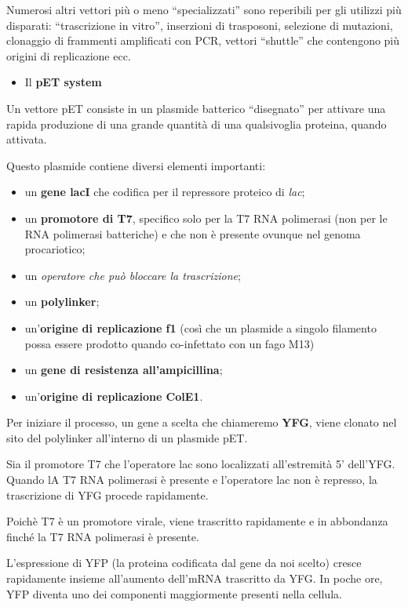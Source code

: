 \documentclass[11pt]{book}
\begin{document}
Numerosi altri vettori più o meno ``specializzati'' sono reperibili per
gli utilizzi più disparati: ``trascrizione in vitro'', inserzioni di
trasposoni, selezione di mutazioni, clonaggio di frammenti amplificati
con PCR, vettori ``shuttle'' che contengono più origini di replicazione
ecc.

\begin{itemize}
\itemsep1pt\parskip0pt
\item
  Il \textbf{pET system}
\end{itemize}

Un vettore pET consiste in un plasmide batterico ``disegnato'' per
attivare una rapida produzione di una grande quantità di una
qualsivoglia proteina, quando attivata.

Questo plasmide contiene diversi elementi importanti:

\begin{itemize}
\itemsep1pt\parskip0pt
\item
  un \textbf{gene lacI} che codifica per il repressore proteico di
  \emph{lac};
\item
  un \textbf{promotore di T7}, specifico solo per la T7 RNA polimerasi
  (non per le RNA polimerasi batteriche) e che non è presente ovunque
  nel genoma procariotico;
\item
  un \emph{operatore che può bloccare la trascrizione};
\item
  un \textbf{polylinker};
\item
  un'\textbf{origine di replicazione f1} (così che un plasmide a singolo
  filamento possa essere prodotto quando co-infettato con un fago M13)
\item
  un \textbf{gene di resistenza all'ampicillina};
\item
  un'\textbf{origine di replicazione ColE1}.
\end{itemize}

Per iniziare il processo, un gene a scelta che chiameremo \textbf{YFG},
viene clonato nel sito del polylinker all'interno di un plasmide pET.

Sia il promotore T7 che l'operatore lac sono localizzati all'estremità
5' dell'YFG. Quando lA T7 RNA polimerasi è presente e l'operatore lac
non è represso, la trascrizione di YFG procede rapidamente.

Poichè T7 è un promotore virale, viene trascritto rapidamente e in
abbondanza finché la T7 RNA polimerasi è presente.

L'espressione di YFP (la proteina codificata dal gene da noi scelto)
cresce rapidamente insieme all'aumento dell'mRNA trascritto da YFG. In
poche ore, YFP diventa uno dei componenti maggiormente presenti nella
cellula.
\end{document}

